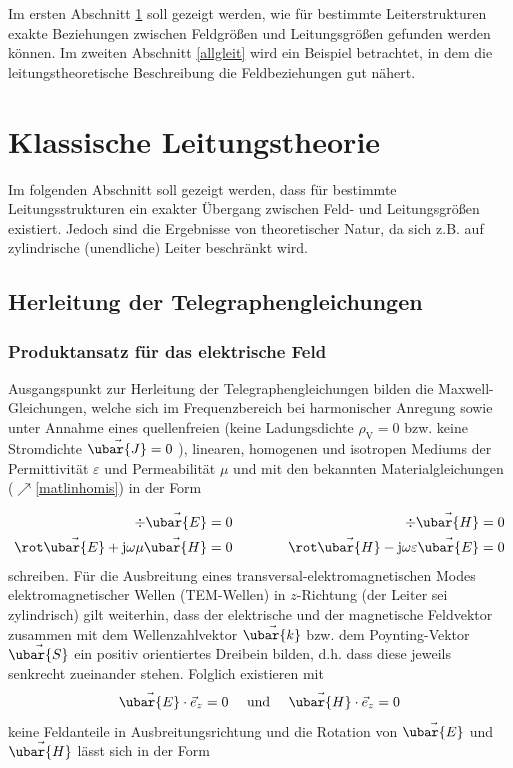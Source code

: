 Im ersten Abschnitt \ref{klassleit} soll gezeigt werden, wie für bestimmte Leiterstrukturen exakte Beziehungen zwischen Feldgrößen und Leitungsgrößen gefunden werden können. Im zweiten Abschnitt \ref{allgleit} wird ein Beispiel betrachtet, in dem die leitungstheoretische Beschreibung die Feldbeziehungen gut nähert.
\section{Klassische Leitungstheorie} \label{klassleit}
Im folgenden Abschnitt soll gezeigt werden, dass für bestimmte Leitungsstrukturen ein exakter Übergang zwischen Feld- und Leitungsgrößen existiert. Jedoch sind die Ergebnisse von theoretischer Natur, da sich z.B. auf zylindrische (unendliche) Leiter beschränkt wird.
\subsection{Herleitung der Telegraphengleichungen}
\subsubsection{Produktansatz für das elektrische Feld}
Ausgangspunkt zur Herleitung der Telegraphengleichungen bilden die Maxwell-Gleichungen, welche sich im Frequenzbereich bei harmonischer Anregung sowie unter Annahme eines quellenfreien (keine Ladungsdichte $\rho_{\mathrm{V}}=0$ bzw. keine Stromdichte $\vec{\ubar{J}}=0$ ), linearen, homogenen und isotropen Mediums der Permittivität $\varepsilon$ und Permeabilität $\mu$ und mit den bekannten Materialgleichungen ($\nearrow$\ref{matlinhomis}) in der Form

\begin{equation}\label{maxglfuertel}
\begin{aligned}
	\div \vec{\ubar{E}} & =0 &\quad\quad\quad \div \vec{\ubar{H}} & =0 \\
	\rot \vec{\ubar{E}}+\mathrm{j} \omega \mu \vec{\ubar{H}} & =0 &\quad\quad\quad  \rot \vec{\ubar{H}}-\mathrm{j} \omega \varepsilon \vec{\ubar{E}} & =0
\end{aligned}
\end{equation}
schreiben. Für die Ausbreitung eines transversal-elektromagnetischen Modes elektromagnetischer Wellen (TEM-Wellen) in $z$-Richtung (der Leiter sei zylindrisch) gilt weiterhin, dass der elektrische und der magnetische Feldvektor zusammen mit dem Wellenzahlvektor $\vec{\ubar{k}}$ bzw. dem Poynting-Vektor $\vec{\ubar{S}}$ ein positiv orientiertes Dreibein bilden, d.h. dass diese jeweils senkrecht zueinander stehen. Folglich existieren mit
\begin{equation}
	\vec{\ubar{E}} \cdot \vec{e}_{z}=0 \quad \text { und } \quad \vec{\ubar{H}} \cdot \vec{e}_{z}=0 
\end{equation}
keine Feldanteile in Ausbreitungsrichtung und die Rotation von $\vec{\ubar{E}}$ und $\vec{\ubar{H}}$ lässt sich in der Form

